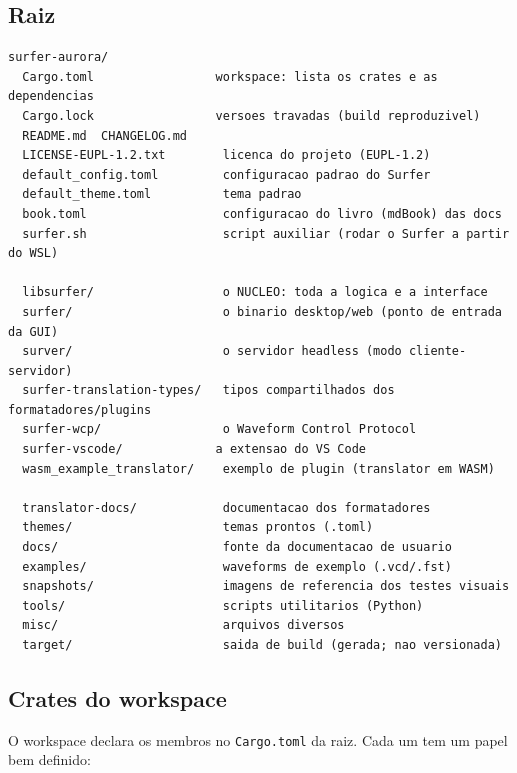 \documentclass[11pt,a4paper]{article}
\begin{document}
\subsection{Raiz}

\begin{lstlisting}
surfer-aurora/
  Cargo.toml                 workspace: lista os crates e as dependencias
  Cargo.lock                 versoes travadas (build reproduzivel)
  README.md  CHANGELOG.md
  LICENSE-EUPL-1.2.txt        licenca do projeto (EUPL-1.2)
  default_config.toml         configuracao padrao do Surfer
  default_theme.toml          tema padrao
  book.toml                   configuracao do livro (mdBook) das docs
  surfer.sh                   script auxiliar (rodar o Surfer a partir do WSL)

  libsurfer/                  o NUCLEO: toda a logica e a interface
  surfer/                     o binario desktop/web (ponto de entrada da GUI)
  surver/                     o servidor headless (modo cliente-servidor)
  surfer-translation-types/   tipos compartilhados dos formatadores/plugins
  surfer-wcp/                 o Waveform Control Protocol
  surfer-vscode/             a extensao do VS Code
  wasm_example_translator/    exemplo de plugin (translator em WASM)

  translator-docs/            documentacao dos formatadores
  themes/                     temas prontos (.toml)
  docs/                       fonte da documentacao de usuario
  examples/                   waveforms de exemplo (.vcd/.fst)
  snapshots/                  imagens de referencia dos testes visuais
  tools/                      scripts utilitarios (Python)
  misc/                       arquivos diversos
  target/                     saida de build (gerada; nao versionada)
\end{lstlisting}

\subsection{Crates do workspace}

O workspace declara os membros no \texttt{Cargo.toml} da raiz. Cada um tem um
papel bem definido:
\end{document}
